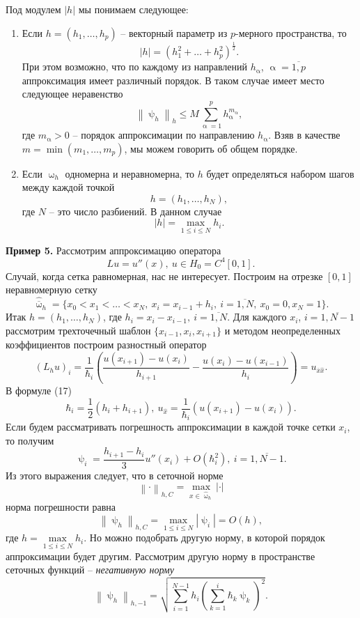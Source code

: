 \documentclass[a4paper, 12pt]{report}
\numberwithin{equation}{section}
\newcommand{\ol}{\overline}
\renewcommand{\leq}{\leqslant}
\renewcommand{\alpha}{\upalpha}
\renewcommand{\psi}{\uppsi}
\renewcommand{\omega}{\upomega}
\newcommand\Norm[1]{\left\| #1 \right\|}
\begin{document}
\\\\
Под модулем $|h|$ мы понимаем следующее:
\begin{enumerate}
\item Если $h = (h_1,\ldots, h_p)$ -- векторный параметр из $p$-мерного пространства, то $$|h| = \left(h_1^2 + \ldots + h_p^2\right)^\frac12.$$
При этом возможно, что по каждому из направлений $h_\alpha$, $\alpha = \overline{1,p}$ аппроксимация имеет различный порядок. В таком случае имеет место следующее неравенство
$$\Norm{\psi_h}_h \leq M \sum_{\alpha=1}^{p}h_\alpha^{m_\alpha},$$
где $m_\alpha>0$ -- порядок аппроксимации по направлению $h_\alpha$. Взяв в качестве $m = \min (m_1,\ldots, m_p)$, мы можем говорить об общем порядке.
\item Если $\omega_h$ одномерна и неравномерна, то $h$ будет определяться набором шагов между каждой точкой $$h = (h_1,\ldots, h_N),$$ где $N$ -- это число разбиений. В данном случае $$|h| = \underset{1\leq i \leq N}{\max}h_i.$$
\end{enumerate}
\textbf{Пример 5.} Рассмотрим аппроксимацию оператора $$Lu = u''(x),\ u\in H_0 = C^4[0,1].$$
Случай, когда сетка равномерная, нас не интересует. Построим на отрезке $[0,1]$ неравномерную сетку $$\hat{\ol \omega}_h = \{x_0 < x_1 < \ldots < x_N,\ x_i = x_{i-1}+h_{i},\ i=\ol{1,N},\ x_0=0, x_N=1\}.$$
Итак $h = (h_1,\ldots, h_N)$, где $h_i = x_i - x_{i-1},\ i=\ol{1,N}.$ Для каждого $x_i$, $i=\ol {1, N-1}$ рассмотрим трехточечный шаблон $\{x_{i-1}, x_i, x_{i+1}\}$ и методом неопределенных коэффициентов построим разностный оператор \begin{equation}
(L_hu)_i = \dfrac{1}{ \hbar_i}\left(\dfrac{u(x_{i+1}) - u(x_i)}{h_{i+1}} - \dfrac{u(x_i) - u(x_{i-1})}{h_i}\right)=u_{\ol x \hat x}.
\end{equation}
В формуле (17) $$\hbar_i = \dfrac12 (h_i + h_{i+1}),\ u_{\hat x}=\dfrac{1}{\hbar_i}(u(x_{i+1}) - u(x_i)).$$
Если будем рассматривать погрешность аппроксимации в каждой точке сетки $x_i$, то получим
$$\psi_i = \dfrac{h_{i+1} - h_i}{3}u''(x_i) + O(\hbar_i^2),\ i = \ol{1, N-1}.$$
Из этого выражения следует, что в сеточной норме $$\Norm{\cdot}_{h, C} = \underset{x \in \hat \omega_h}{\max}|\cdot |$$
норма погрешности равна
$$\Norm{\psi_h}_{h,C} = \underset{1\leq i \leq N}{\max}|\psi_i|=O(h),$$
где $h = \underset{1\leq i \leq N}{\max}h_i.$
Но можно подобрать другую норму, в которой порядок аппроксимации будет другим. Рассмотрим другую норму в пространстве сеточных функций -- \textit{негативную норму}
$$\Norm{\psi_h}_{h, -1}=\sqrt{\sum_{i=1}^{N-1}h_i\left(\sum_{k=1}^i \hbar_k \psi_k\right)^2}.$$
\end{document}
